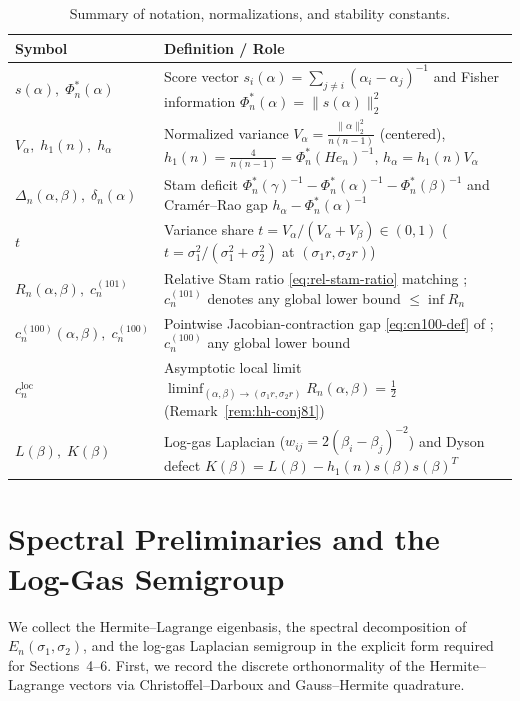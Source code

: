 \documentclass[11pt,a4paper]{article}
\theoremstyle{definition}
\begin{document}
\begin{table}[htbp]
\centering
\small
\caption{Summary of notation, normalizations, and stability constants.}
\label{tab:notation}
\begin{tabularx}{\textwidth}{@{} >{\raggedright\arraybackslash}p{3.0cm} >{\raggedright\arraybackslash}X @{}}
\toprule
Symbol & Definition / Role \\
\midrule
$s(\alpha),\; \Phi_n^*(\alpha)$ & Score vector $s_i(\alpha) = \sum_{j\neq i}(\alpha_i-\alpha_j)^{-1}$ and Fisher information $\Phi_n^*(\alpha) = \|s(\alpha)\|_2^2$ \\
$V_\alpha,\; h_1(n),\; h_\alpha$ & Normalized variance $V_\alpha = \frac{\|\alpha\|_2^2}{n(n-1)}$ (centered), $h_1(n) = \frac{4}{n(n-1)} = \Phi_n^*(He_n)^{-1}$, $h_\alpha = h_1(n)V_\alpha$ \\
$\Delta_n(\alpha,\beta),\; \delta_n(\alpha)$ & Stam deficit $\Phi_n^*(\gamma)^{-1} - \Phi_n^*(\alpha)^{-1} - \Phi_n^*(\beta)^{-1}$ and Cram\'er--Rao gap $h_\alpha - \Phi_n^*(\alpha)^{-1}$ \\
$t$ & Variance share $t = V_\alpha/(V_\alpha + V_\beta) \in (0,1)$ ($t = \sigma_1^2/(\sigma_1^2+\sigma_2^2)$ at $(\sigma_1 r, \sigma_2 r)$) \\
$R_n(\alpha,\beta),\; c_n^{(101)}$ & Relative Stam ratio \eqref{eq:rel-stam-ratio} matching \cite[eq.~(101)]{HH2026}; $c_n^{(101)}$ denotes any global lower bound $\le \inf R_n$ \\
$c_n^{(100)}(\alpha,\beta),\; c_n^{(100)}$ & Pointwise Jacobian-contraction gap \eqref{eq:cn100-def} of \cite[eq.~(100)]{HH2026}; $c_n^{(100)}$ any global lower bound \\
$c_n^{\mathrm{loc}}$ & Asymptotic local limit $\liminf_{(\alpha,\beta)\to(\sigma_1 r,\sigma_2 r)} R_n(\alpha,\beta) = \frac{1}{2}$ (Remark~\ref{rem:hh-conj81}) \\
$L(\beta),\; K(\beta)$ & Log-gas Laplacian ($w_{ij}=2(\beta_i-\beta_j)^{-2}$) and Dyson defect $K(\beta) = L(\beta) - h_1(n)s(\beta)s(\beta)^T$ \\
\bottomrule
\end{tabularx}
\end{table}

\section{Spectral Preliminaries and the Log-Gas Semigroup}

We collect the Hermite--Lagrange eigenbasis, the spectral decomposition of $E_n(\sigma_1,\sigma_2)$, and the log-gas Laplacian semigroup in the explicit form required for Sections~4--6. First, we record the discrete orthonormality of the Hermite--Lagrange vectors via Christoffel--Darboux and Gauss--Hermite quadrature.
\end{document}
